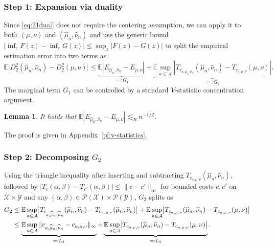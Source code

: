 \documentclass[11pt]{amsart}
\newtheorem{lemma}[theorem]{Lemma}
\theoremstyle{definition}
\theoremstyle{remark}
\newcommand{\cA}{\mathcal{A}}
\newcommand{\E}{\mathbb{E}}
\newcommand{\1}{\mathbf{1}}
\numberwithin{equation}{section}
\begin{document}
\subsubsection*{Step 1: Expansion via duality}
Since \eqref{eq:21dual} does not require the centering assumption, we can
apply it to both $(\mu,\nu)$ and $(\widehat\mu_n,\widehat\nu_n)$ and use
the generic bound
$|\inf_{z}F(z)-\inf_{z}G(z)|\le\sup_{z}|F(z)-G(z)|$ to split the empirical
estimation error into two terms as
\begin{equation}\label{eq:main-split}
\E\bigl|D_2^2(\widehat\mu_n,\widehat\nu_n)-D_2^2(\mu,\nu)\bigr|
\le
\underbrace{
\E|E_{\widehat\mu_n,\widehat\nu_n}-E_{\mu,\nu}|
}_{=:G_1}+
\underbrace{
\E \sup_{a\in\cA}
\left|T_{c_{a,\widehat\mu_n,\widehat\nu_n}}(\widehat\mu_n,\widehat\nu_n)
-T_{c_{a,\mu,\nu}}(\mu,\nu)\right|
}_{=:G_2}.
\end{equation}
The marginal term $G_1$ can be controlled by a standard $V$-statistic
concentration argument.

\begin{lemma}
\label{lem:v-statistics}
It holds that
$\E|E_{\widehat\mu_n,\widehat\nu_n}-E_{\mu,\nu}|
\lesssim_{R} n^{-1/2}$.
\end{lemma}
The proof is given in Appendix~\ref{pf:v-statistics}.

\subsubsection*{Step 2: Decomposing $G_2$}
Using the triangle inequality after inserting and subtracting
$T_{c_{a,\mu,\nu}}(\widehat\mu_n,\widehat\nu_n)$, followed by
$|T_c(\alpha,\beta)-T_{c'}(\alpha,\beta)|\le\|c-c'\|_\infty$ for bounded
costs $c,c'$ on $\mathcal{X}\times\mathcal{Y}$ and any
$(\alpha,\beta)\in\mathcal{P}(\mathcal{X})\times\mathcal{P}(\mathcal{Y})$,
$G_2$ splits as
\begin{align}\label{eq:main-split2}
  G_2
  &\le
  \E\sup_{a\in\cA}
    \bigl|T_{c_{a,\widehat\mu_n,\widehat\nu_n}}(\widehat\mu_n,\widehat\nu_n)
    -T_{c_{a,\mu,\nu}}(\widehat\mu_n,\widehat\nu_n)\bigr|
  +
  \E\sup_{a\in\cA}
    \bigl|T_{c_{a,\mu,\nu}}(\widehat\mu_n,\widehat\nu_n)
    -T_{c_{a,\mu,\nu}}(\mu,\nu)\bigr|
  \notag\\
  &\le
  \underbrace{\E\sup_{a\in\cA}
    \|c_{a,\widehat\mu_n,\widehat\nu_n}-c_{a,\mu,\nu}\|_\infty}_{=:L_1}
  +
  \underbrace{\E\sup_{a\in\cA}
    \bigl|T_{c_{a,\mu,\nu}}(\widehat\mu_n,\widehat\nu_n)
    -T_{c_{a,\mu,\nu}}(\mu,\nu)\bigr|}_{=:L_2}.
\end{align}
\end{document}
